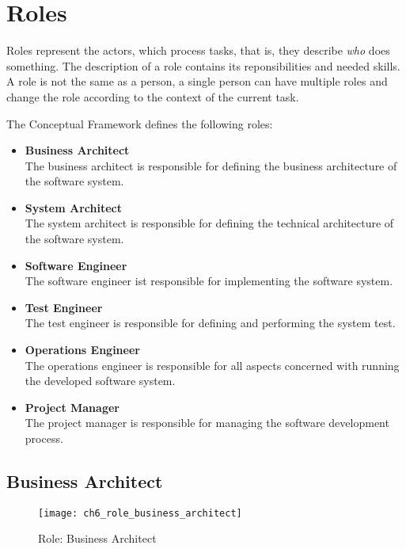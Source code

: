 \section{Roles}
\label{sec:ch6_roles}

Roles represent the actors, which process tasks, that is, they describe \emph{who} does something. The description of a role contains its reponsibilities and needed skills. 
A role is not the same as a person, a single person can have multiple roles and change the role according to the context of the current task.

The Conceptual Framework defines the following roles:
\begin{itemize}
	\item \textbf{Business Architect}\\
	The business architect is responsible for defining the business architecture of the software system.
	\item \textbf{System Architect}\\ 
	The system architect is responsible for defining the technical architecture of the software system.
	\item \textbf{Software Engineer}\\
	The software engineer ist responsible for implementing the software system.
	\item \textbf{Test Engineer}\\
	The test engineer is responsible for defining and performing the system test.
	\item \textbf{Operations Engineer}\\
	The operations engineer is responsible for all aspects concerned with running the developed software system.
	\item \textbf{Project Manager}\\
	The project manager is responsible for managing the software development process.
\end{itemize}

\subsection{Business Architect}

\begin{figure}[htpb] \centering 
	\texttt{[image: ch6\_role\_business\_architect]} 
	\caption{Role: Business Architect} 
	\label{fig:ch6_role_business_architect} 
\end{figure}

